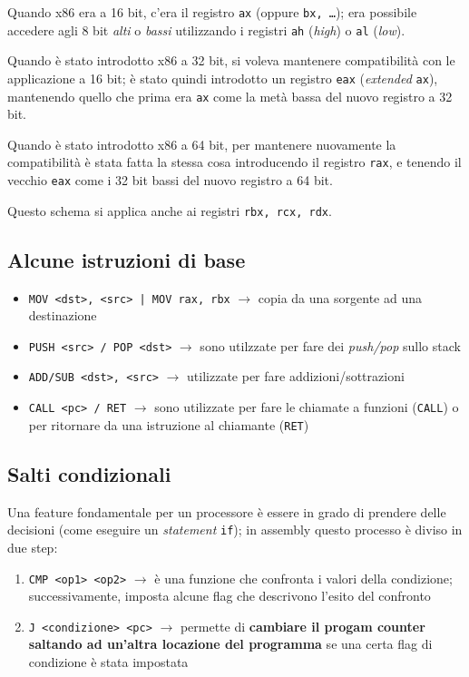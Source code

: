 Quando x86 era a 16 bit, c'era il registro \texttt{ax} (oppure \texttt{bx, \dots}); era possibile
accedere agli 8 bit \textit{alti} o \textit{bassi} utilizzando i registri \texttt{ah} (\textit{high}) o \texttt{al} (\textit{low}).

Quando è stato introdotto x86 a 32 bit, si voleva mantenere compatibilità con le applicazione a 16 bit;
è stato quindi introdotto un registro \texttt{eax} (\textit{extended} \texttt{ax}), mantenendo
quello che prima era \texttt{ax} come la metà bassa del nuovo registro a 32 bit.

Quando è stato introdotto x86 a 64 bit, per mantenere nuovamente la compatibilità è stata fatta
la stessa cosa introducendo il registro \texttt{rax}, e tenendo il vecchio \texttt{eax} come 
i 32 bit bassi del nuovo registro a 64 bit.

Questo schema si applica anche ai registri \texttt{rbx, rcx, rdx}.

\subsection{Alcune istruzioni di base}

\begin{itemize}
    \item \texttt{MOV <dst>, <src> | MOV rax, rbx} $\rightarrow$ copia da una sorgente ad una destinazione
    \item \texttt{PUSH <src> / POP <dst>} $\rightarrow$ sono utilzzate per fare dei \textit{push/pop} sullo stack
    \item \texttt{ADD/SUB <dst>, <src>} $\rightarrow$ utilizzate per fare addizioni/sottrazioni
    \item \texttt{CALL <pc> / RET} $\rightarrow$ sono utilizzate per fare le chiamate a funzioni (\texttt{CALL}) o per
    ritornare da una istruzione al chiamante (\texttt{RET})
\end{itemize}

\newpage
\subsection{Salti condizionali}

Una feature fondamentale per un processore è essere in grado di prendere delle decisioni (come eseguire un \textit{statement} \texttt{if}); in 
assembly questo processo è diviso in due step:

\begin{enumerate}
    \item \texttt{CMP <op1> <op2>} $\rightarrow$ è una funzione che confronta i valori della condizione; successivamente, imposta
    alcune flag che descrivono l'esito del confronto
    \item \texttt{J <condizione> <pc>} $\rightarrow$ permette di \textbf{cambiare il progam counter saltando ad un'altra locazione del programma} se una certa flag
    di condizione è stata impostata
\end{enumerate}


